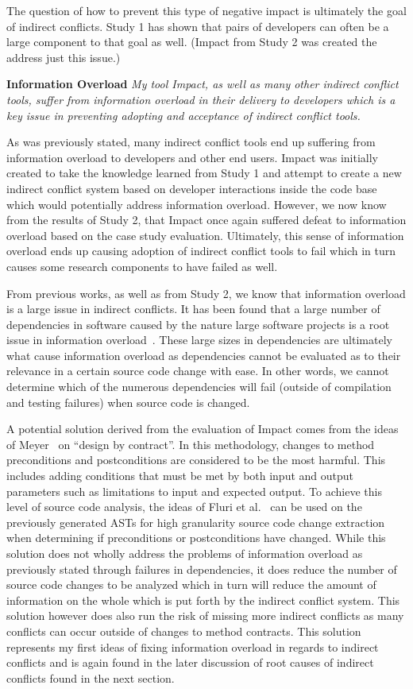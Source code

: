 The question of how to prevent this type of negative impact is ultimately the goal of indirect conflicts. Study 1 has
shown that pairs of developers can often be a large component to that goal as well. (Impact from Study 2 was
created the address just this issue.) 

\textbf{Information Overload} \textit{My tool Impact, as well as many other indirect conflict tools, suffer from
information overload in their delivery to developers which is a key issue in preventing adopting and acceptance
of indirect conflict tools.}

As was previously stated, many indirect conflict tools end up suffering from information overload to developers
and other end users. Impact was initially created to take the knowledge learned from Study 1 and attempt to create
a new indirect conflict system based on developer interactions inside the code base which would potentially address
information overload. However, we now know from the results of Study 2, that Impact once again suffered defeat to information
overload based on the case study evaluation. Ultimately, this sense of information overload ends up causing
adoption of indirect conflict tools to fail which in turn causes some research components to have failed as
well.

From previous works, as well as from Study 2, we know that information overload is a large issue in indirect
conflicts. It has been found that a large number of dependencies in software caused by the nature large software
projects is a root issue in information overload~\cite{Sarma:2007:TSA,Servant:2010:CPI}. These large sizes in
dependencies are ultimately what cause information overload as dependencies cannot be evaluated as to their
relevance in a certain source code change with ease. In other words, we cannot determine which of the numerous
dependencies will fail (outside of compilation and testing failures) when source code is changed.

A potential solution derived from the evaluation of Impact comes from the ideas of Meyer~\cite{Meyer:1988} on 
``design by contract''. In this methodology, changes to method preconditions and postconditions are considered 
to be the most harmful. This includes adding conditions that must be met by both input and output parameters 
such as limitations to input and expected output. To achieve this level of source code analysis, the ideas of 
Fluri et al.~\cite{Fluri:2007:CDT} can be used on the previously generated ASTs for high granularity source code 
change extraction when determining if preconditions or postconditions have changed. While this solution does not 
wholly address the problems of information overload as previously stated through failures in dependencies, it does 
reduce the number of source code changes to  be analyzed which in turn will reduce the amount of information on 
the whole which is put forth by the indirect
conflict system. This solution however does also run the risk of missing more indirect conflicts as many conflicts
can occur outside of changes to method contracts. This solution represents my first ideas of fixing information overload in regards to
indirect conflicts and is again found in the later discussion of root causes of indirect conflicts found in
the next section.

